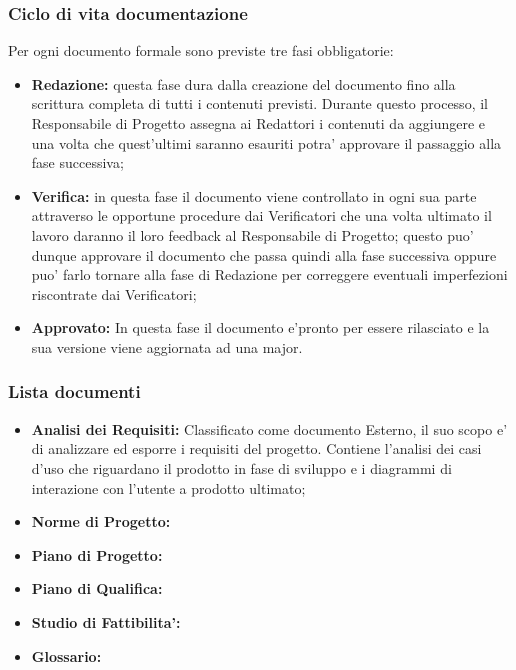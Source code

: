 		\subsubsection{Ciclo di vita documentazione}
			Per ogni documento formale sono previste tre fasi obbligatorie:
			\begin{itemize}
			\item \textbf{Redazione:} questa fase dura dalla creazione del documento fino alla scrittura completa di tutti i contenuti previsti. Durante questo processo, il Responsabile di Progetto assegna ai Redattori i contenuti da aggiungere e una volta che quest'ultimi saranno esauriti potra' approvare il passaggio alla fase successiva;
			\item \textbf{Verifica:} in questa fase il documento viene controllato in ogni sua parte attraverso le opportune procedure dai Verificatori che una volta ultimato il lavoro daranno il loro feedback al Responsabile di Progetto; questo puo' dunque approvare il documento che passa quindi alla fase successiva oppure puo' farlo tornare alla fase di Redazione per correggere eventuali imperfezioni riscontrate dai Verificatori;
			\item \textbf{Approvato:} In questa fase il documento e'pronto per essere rilasciato e la sua versione viene aggiornata ad una major.
			\end{itemize}
		\subsubsection{Lista documenti}
		\label{3.1.5}
			\begin{itemize}
				\item \textbf{Analisi dei Requisiti:} \newline
				Classificato come documento Esterno, il suo scopo e' di analizzare ed esporre i requisiti del progetto. Contiene l'analisi dei casi d'uso che riguardano il prodotto in fase di sviluppo e i diagrammi di interazione con l'utente a prodotto ultimato;
				\item \textbf{Norme di Progetto:} \newline
				
				\item \textbf{Piano di Progetto:} \newline
				
				\item \textbf{Piano di Qualifica:} \newline
				
				\item \textbf{Studio di Fattibilita':} \newline
				
				\item \textbf{Glossario:} \newline
				
			\end{itemize}
